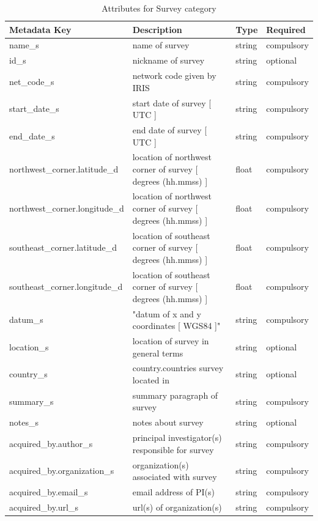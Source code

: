 \documentclass{article}
\begin{document}
\begin{table}[htb!]
	\caption[Attributes for Survey]{Attributes for Survey category}
	\begin{tabular}{|l|l|l|l|}
		\hline
		\textbf{Metadata Key} & \textbf{Description} & \textbf{Type} & \textbf{Required} \\ \hline
		name\_s & name of survey & string & compulsory \\ \hline
		id\_s & nickname of survey & string & optional \\ \hline
		net\_code\_s & network code given by IRIS & string & compulsory \\ \hline
		start\_date\_s & start date of survey [ UTC ] & string & compulsory \\ \hline
		end\_date\_s & end date of survey [ UTC ] & string & compulsory \\ \hline
		northwest\_corner.latitude\_d & location of northwest corner of survey [ degrees (hh.mmss) ] & float & compulsory \\ \hline
		northwest\_corner.longitude\_d & location of northwest corner of survey [ degrees (hh.mmss) ] & float & compulsory \\ \hline
		southeast\_corner.latitude\_d & location of southeast corner of survey  [ degrees (hh.mmss) ] & float & compulsory \\ \hline
		southeast\_corner.longitude\_d & location of southeast corner of survey  [ degrees (hh.mmss) ] & float & compulsory \\ \hline
		datum\_s & "datum of x and y coordinates [ WGS84 ]" & string & compulsory \\ \hline
		location\_s & location of survey in general terms & string & optional \\ \hline
		country\_s & country.countries survey located in & string & optional \\ \hline
		summary\_s & summary paragraph of survey & string & compulsory \\ \hline
		notes\_s & notes about survey & string & optional \\ \hline
		acquired\_by.author\_s & principal investigator(s) responsible for survey & string & compulsory \\ \hline
		acquired\_by.organization\_s & organization(s) associated with survey & string & compulsory \\ \hline
		acquired\_by.email\_s & email address of PI(s) & string & compulsory \\ \hline
		acquired\_by.url\_s & url(s) of organization(s) & string & compulsory \\ \hline

\end{tabular}
\end{table}
\end{document}
